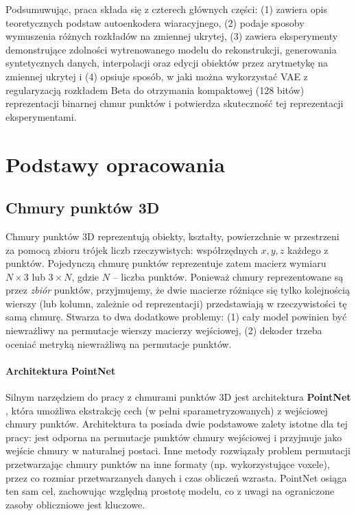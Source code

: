 \documentclass{iithesis}
\begin{document}
Podsumuwując, praca składa się z czterech głównych części: (1) zawiera opis teoretycznych podstaw
autoenkodera wiaracyjnego, (2) podaje sposoby wymuszenia różnych rozkładów na zmiennej ukrytej,
(3) zawiera eksperymenty demonstrujące zdolności wytrenowanego modelu do rekonstrukcji,
generowania syntetycznych danych, interpolacji oraz edycji obiektów przez arytmetykę na zmiennej ukrytej
i (4) opsiuje sposób, w jaki można wykorzystać VAE z regularyzacją rozkładem Beta do otrzymania
kompaktowej (128 bitów) reprezentacji binarnej chmur punktów i potwierdza skuteczność tej
reprezentacji eksperymentami.

\chapter{Podstawy opracowania}

\section{Chmury punktów 3D}
Chmury punktów 3D reprezentują obiekty, kształty, powierzchnie w przestrzeni za pomocą zbioru
trójek liczb rzeczywistych: współrzędnych $x,y,z$ każdego z punktów.
Pojedynczą chmurę punktów reprezentuje zatem macierz wymiaru $N \times 3$ lub $3 \times N$,
gdzie $N$ -- liczba punktów. Ponieważ chmury reprezentowane są przez \textit{zbiór} punktów,
przyjmujemy, że dwie macierze różniące się tylko kolejnością wierszy (lub kolumn, zależnie od reprezentacji)
przedstawiają w rzeczywistości tę samą chmurę. Stwarza to dwa dodatkowe problemy: (1) cały model powinien
być niewrażliwy na permutacje wierszy macierzy wejściowej, (2) dekoder trzeba oceniać metryką niewrażliwą
na permutacje punktów.

\subsubsection{Architektura PointNet} \label{sec:related_pointnet}
Silnym narzędziem do pracy z chmurami punktów 3D jest architektura \textbf{PointNet} \cite{pointnet},
która umożliwa ekstrakcję cech (w pełni sparametryzowanych) z wejściowej chmury punktów.
Architektura ta posiada dwie podstawowe zalety istotne dla tej pracy: jest odporna na permutacje
punktów chmury wejściowej i przyjmuje jako wejście chmury w naturalnej postaci.
Inne metody rozwiązały problem permutacji przetwarzając chmury punktów na inne formaty (np. wykorzystujące voxele),
przez co rozmiar przetwarzanych danych i czas obliczeń wzrasta. PointNet osiąga ten sam cel, zachowując
względną prostotę modelu, co z uwagi na ograniczone zasoby obliczniowe jest kluczowe.
\end{document}
